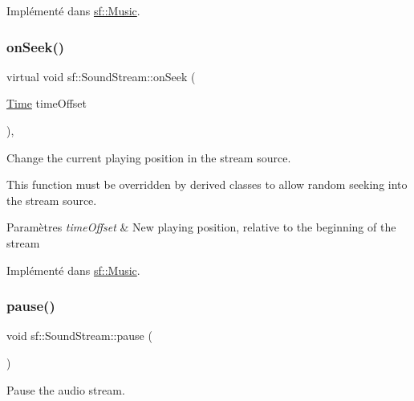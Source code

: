 Implémenté dans \hyperlink{classsf_1_1Music_aca1bcb4e5d56a854133e74bd86374463}{sf\+::\+Music}.

\mbox{\label{classsf_1_1SoundStream_a907036dd2ca7d3af5ead316e54b75997}} 
\subsubsection{\texorpdfstring{on\+Seek()}{onSeek()}}
{\footnotesize\ttfamily virtual void sf\+::\+Sound\+Stream\+::on\+Seek (\begin{DoxyParamCaption}\item[{\hyperlink{classsf_1_1Time}{Time}}]{time\+Offset }\end{DoxyParamCaption})\hspace{0.3cm}{\ttfamily [protected]}, {}}



Change the current playing position in the stream source. 

This function must be overridden by derived classes to allow random seeking into the stream source.


\begin{DoxyParams}{Paramètres}
{\em time\+Offset} & New playing position, relative to the beginning of the stream \\
\hline
\end{DoxyParams}


Implémenté dans \hyperlink{classsf_1_1Music_a15119cc0419c16bb334fa0698699c02e}{sf\+::\+Music}.

\mbox{\label{classsf_1_1SoundStream_a932ff181e661503cad288b4bb6fe45ca}} 
\subsubsection{\texorpdfstring{pause()}{pause()}}
{\footnotesize\ttfamily void sf\+::\+Sound\+Stream\+::pause (\begin{DoxyParamCaption}{ }\end{DoxyParamCaption})}



Pause the audio stream. 

